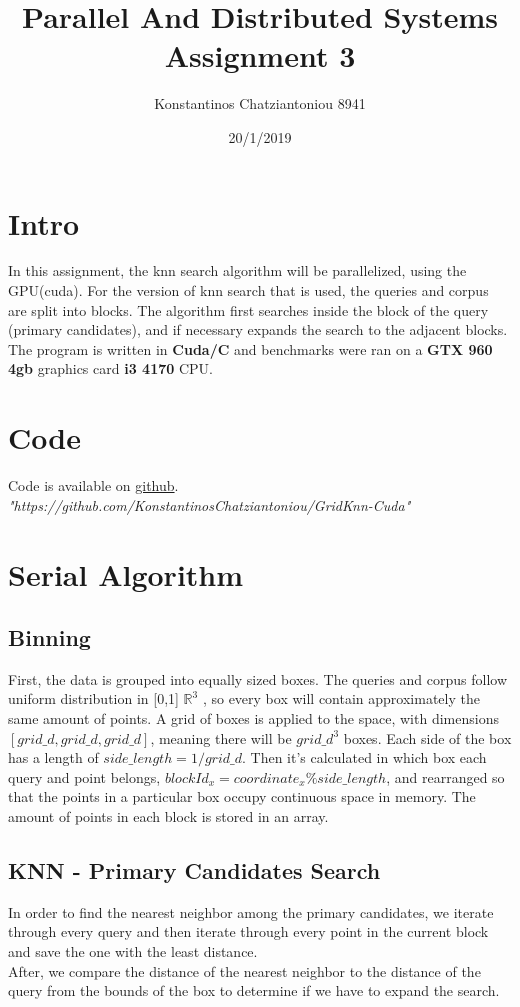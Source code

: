 \documentclass[10pt,a4paper]{article}
\begin{document}
\title{Parallel And Distributed Systems \\ Assignment 3}
\author{Konstantinos Chatziantoniou 8941}
\date{20/1/2019}
\maketitle


\section*{Intro}
In this assignment, the knn search algorithm will be parallelized, using the GPU(cuda). For the version of knn search that is used, the queries and corpus are split into blocks. The algorithm  first searches inside the block of the query (primary candidates), and if necessary expands the search to the adjacent blocks. The program is written in \textbf{Cuda/C} and benchmarks were ran on a \textbf{GTX 960 4gb} graphics card \textbf{i3 4170} CPU.
\section*{Code}
Code is available on \textcolor{violet}{\href{https://github.com/KonstantinosChatziantoniou/GridKnn-Cuda}{github}}. \\ \textit{"https://github.com/KonstantinosChatziantoniou/GridKnn-Cuda"}


\section*{Serial Algorithm}
\subsection*{Binning}
First, the data is grouped into equally sized boxes. The queries and corpus follow uniform distribution in [0,1] $\mathbb{R}^3$ , so every box will contain approximately the same amount of points. A grid of boxes is applied to the space, with dimensions $[grid\_d,grid\_d,grid\_d]$, meaning there will be $grid\_d^3$ boxes. Each side of the box has a length of $side\_length = 1/grid\_d$. Then it's calculated in which box each query and point belongs, $blockId_x = coordinate_x \% side\_length$, 
and rearranged so that the points in a particular box occupy continuous space in memory. The amount of points in each block is stored in an array.
\subsection*{KNN - Primary Candidates Search}
In order to find the nearest neighbor among the primary candidates, we iterate through every query and then iterate through every point in the current block and save the one with the least distance. \\
After, we compare the distance of the nearest neighbor to the distance of the query from the bounds of the box to determine if we have to expand the search.
\end{document}
